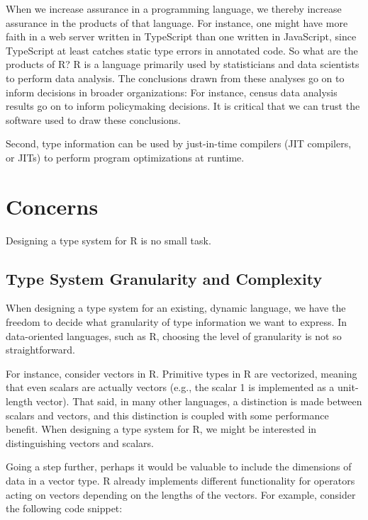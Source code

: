 \documentclass[sigplan,10pt,review,anonymous]{acmart}\settopmatter{printfolios=true,printccs=false,printacmref=false}
\begin{document}
When we increase assurance in a programming language, we thereby increase assurance in the products of that language.
For instance, one might have more faith in a web server written in TypeScript than one written in JavaScript, since TypeScript at least catches static type errors in annotated code.
So what are the products of R?
R is a language primarily used by statisticians and data scientists to perform data analysis. 
The conclusions drawn from these analyses go on to inform decisions in broader organizations:
For instance, census data analysis results go on to inform policymaking decisions.
It is critical that we can trust the software used to draw these conclusions.

Second, type information can be used by just-in-time compilers (JIT compilers, or JITs) to perform program optimizations at runtime.

%
%
%
%
\section{Concerns}

Designing a type system for R is no small task.

%
%
\subsection{Type System Granularity and Complexity}

When designing a type system for an existing, dynamic language, we have the freedom to decide what granularity of type information we want to express.
In data-oriented languages, such as R, choosing the level of granularity is not so straightforward.

For instance, consider vectors in R.
Primitive types in R are vectorized, meaning that even scalars are actually vectors (e.g., the scalar 1 is implemented as a unit-length vector).
That said, in many other languages, a distinction is made between scalars and vectors, and this distinction is coupled with some performance benefit.
When designing a type system for R, we might be interested in distinguishing vectors and scalars.

Going a step further, perhaps it would be valuable to include the dimensions of data in a vector type.
R already implements different functionality for operators acting on vectors depending on the lengths of the vectors.
For example, consider the following code snippet:
\end{document}
